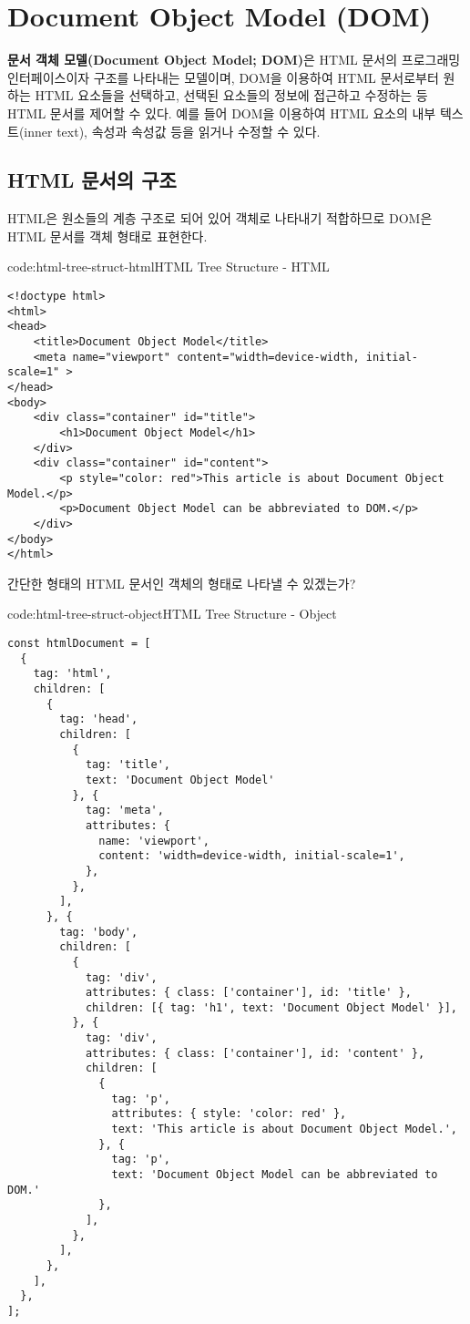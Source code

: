 \section{Document Object Model (DOM)} \label{sect:document-object-model}

\textbf{문서 객체 모델(Document Object Model; DOM)}은 HTML 문서의 프로그래밍 인터페이스이자 구조를 나타내는 모델이며, DOM을 이용하여 HTML 문서로부터 원하는 HTML 요소들을 선택하고, 선택된 요소들의 정보에 접근하고 수정하는 등 HTML 문서를 제어할 수 있다. 예를 들어 DOM을 이용하여 HTML 요소의 내부 텍스트(inner text), 속성과 속성값 등을 읽거나 수정할 수 있다.

\subsection*{HTML 문서의 구조}

HTML은 원소들의 계층 구조로 되어 있어 객체로 나타내기 적합하므로 DOM은 HTML 문서를 객체 형태로 표현한다.

\begin{codeenv}{code:html-tree-struct-html}{HTML Tree Structure - HTML}\begin{verbatim}
<!doctype html>
<html>
<head>
    <title>Document Object Model</title>
    <meta name="viewport" content="width=device-width, initial-scale=1" >
</head>
<body>
    <div class="container" id="title">
        <h1>Document Object Model</h1>
    </div>
    <div class="container" id="content">
        <p style="color: red">This article is about Document Object Model.</p>
        <p>Document Object Model can be abbreviated to DOM.</p>
    </div>
</body>
</html>    
\end{verbatim}
\end{codeenv}

간단한 형태의 HTML 문서인 \을 객체의 형태로 나타낼 수 있겠는가?

\begin{codeenv}{code:html-tree-struct-object}{HTML Tree Structure - Object}\begin{verbatim}
const htmlDocument = [
  {
    tag: 'html',
    children: [
      {
        tag: 'head',
        children: [
          {
            tag: 'title',
            text: 'Document Object Model'
          }, {
            tag: 'meta',
            attributes: {
              name: 'viewport',
              content: 'width=device-width, initial-scale=1',
            },
          },
        ],
      }, {
        tag: 'body',
        children: [
          {
            tag: 'div',
            attributes: { class: ['container'], id: 'title' },
            children: [{ tag: 'h1', text: 'Document Object Model' }],
          }, {
            tag: 'div',
            attributes: { class: ['container'], id: 'content' },
            children: [
              {
                tag: 'p',
                attributes: { style: 'color: red' },
                text: 'This article is about Document Object Model.',
              }, {
                tag: 'p',
                text: 'Document Object Model can be abbreviated to DOM.'
              },
            ],
          },
        ],
      },
    ],
  },
];
\end{verbatim}
\end{codeenv}

